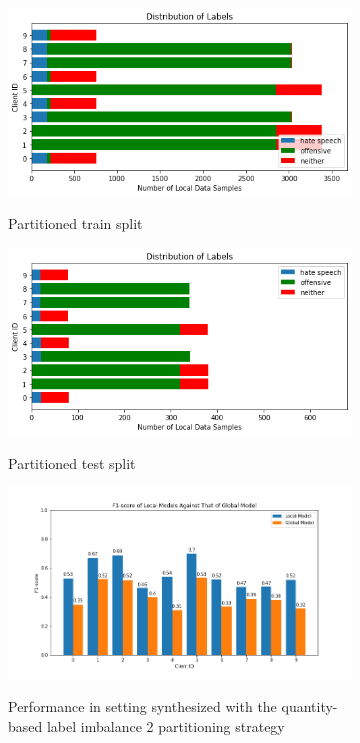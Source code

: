 \documentclass[letterpaper]{article} %
\begin{document}
\begin{figure}[hbt!]

\begin{subfigure}{\columnwidth}
{\includegraphics[width=\columnwidth]{noniid-quantity-based-label-imbalance-2_distribution_of_labels_2}}
\caption{Partitioned train split}
\end{subfigure}

\begin{subfigure}{\columnwidth}
{\includegraphics[width=\columnwidth]{noniid-quantity-based-label-imbalance-2_test_set_distribution_of_labels_2}}
\caption{Partitioned test split}
\end{subfigure}

\begin{subfigure}{\columnwidth}
{\includegraphics[width=\columnwidth]{noniid-quantity-based-label-imbalance-2_seed_2performance_of_local_models_f1score}}
\caption{Performance in setting synthesized with the quantity-based label imbalance 2 partitioning strategy}
\end{subfigure}

\caption{}
\end{figure}
\end{document}
